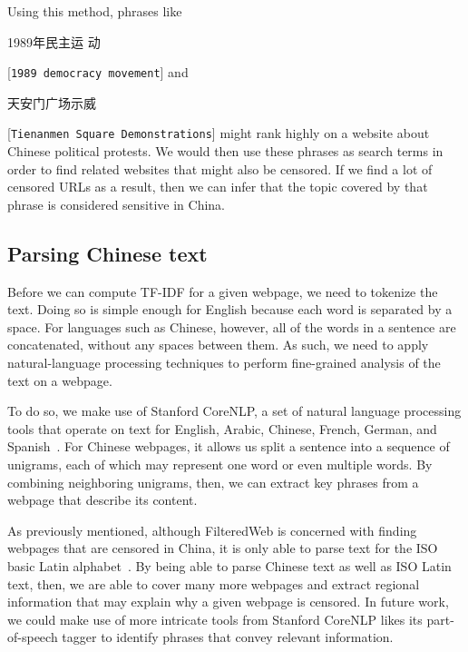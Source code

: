Using this method, phrases like \begin{CJK*}{UTF8}{gbsn}1989年民主运
动\end{CJK*} [\texttt{1989 democracy movement}]
and \begin{CJK*}{UTF8}{gbsn}天安门广场示威\end{CJK*}
[\texttt{Tienanmen Square Demonstrations}] might rank highly on a
website about Chinese political protests. We would then use these phrases
as search terms in order to find related websites that might also be
censored. If we find a lot of censored URLs as a result, then we can
infer that the topic covered by that phrase is considered sensitive in China.

\subsection{Parsing Chinese text}
Before we can compute TF-IDF for a given webpage, we need to tokenize the
text. Doing so is simple enough for English because each word is separated by a
space. For languages such as Chinese, however, all of the words in a sentence are
concatenated, without any spaces between them. As such, we need to apply
natural-language processing techniques to perform fine-grained analysis
of the text on a webpage.

To do so, we make use of Stanford CoreNLP, a set of natural language
processing tools that operate on text for English, Arabic, Chinese, French,
German, and Spanish~\cite{corenlp2016suite}. For Chinese webpages, it allows us
split a sentence into a sequence of unigrams, each of which may represent
one word or even multiple words. By combining neighboring unigrams, then, we
can extract key phrases from a webpage that describe its content.

As previously mentioned, although FilteredWeb is concerned with finding webpages
that are censored in China, it is only able to parse text for the ISO basic
Latin alphabet~\cite{darer2017filteredweb}. By being able to parse Chinese text as
well as ISO Latin text, then, we are able to cover many more webpages and
extract regional information that may explain why a given webpage is
censored. In future work, we could make use of more intricate tools
from Stanford CoreNLP likes its part-of-speech tagger to identify
phrases that convey relevant information.
